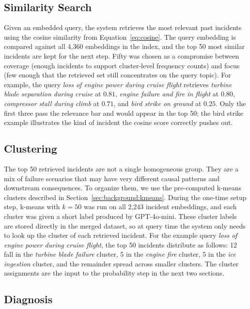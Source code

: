 \documentclass[11pt]{article}
\begin{document}
\subsection{Similarity Search}
\label{sec:phase2:search}

Given an embedded query, the system retrieves the most relevant past incidents using the cosine similarity from Equation~\ref{eq:cosine}. The query embedding is compared against all 4{,}360 embeddings in the index, and the top 50 most similar incidents are kept for the next step. Fifty was chosen as a compromise between coverage (enough incidents to support cluster-level frequency counts) and focus (few enough that the retrieved set still concentrates on the query topic). For example, the query \emph{loss of engine power during cruise flight} retrieves \emph{turbine blade separation during cruise} at $0.81$, \emph{engine failure and fire in flight} at $0.80$, \emph{compressor stall during climb} at $0.71$, and \emph{bird strike on ground} at $0.25$. Only the first three pass the relevance bar and would appear in the top 50; the bird strike example illustrates the kind of incident the cosine score correctly pushes out.

\subsection{Clustering}
\label{sec:phase2:cluster}

The top 50 retrieved incidents are not a single homogeneous group. They are a mix of failure scenarios that may have very different causal patterns and downstream consequences. To organize them, we use the pre-computed k-means clusters described in Section~\ref{sec:background:kmeans}. During the one-time setup step, k-means with $k = 50$ was run on all 2{,}243 incident embeddings, and each cluster was given a short label produced by GPT-4o-mini. These cluster labels are stored directly in the merged dataset, so at query time the system only needs to look up the cluster of each retrieved incident. For the example query \emph{loss of engine power during cruise flight}, the top 50 incidents distribute as follows: 12 fall in the \emph{turbine blade failure} cluster, 5 in the \emph{engine fire} cluster, 5 in the \emph{ice ingestion} cluster, and the remainder spread across smaller clusters. The cluster assignments are the input to the probability step in the next two sections.

\subsection{Diagnosis}
\label{sec:phase2:diag}
\end{document}
